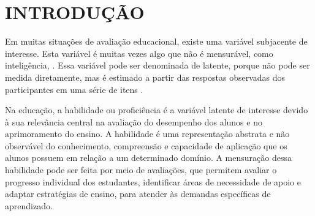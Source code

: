 \chapter{INTRODUÇÃO}

Em muitas situações de avaliação educacional, existe uma variável subjacente de interesse. Esta variável é muitas vezes algo que não é mensurável, como inteligência, \cite{baker2001}. Essa variável pode ser denominada de latente, porque não pode ser medida diretamente, mas é estimado a partir das respostas observadas dos participantes em uma série de itens \cite{pasquali2003}. 


Na educação, a habilidade ou proficiência é a variável latente de interesse devido à sua relevância central na avaliação do desempenho dos alunos e no aprimoramento do ensino. A habilidade é uma representação abstrata e não observável do conhecimento, compreensão e capacidade de aplicação que os alunos possuem em relação a um determinado domínio. A mensuração dessa habilidade pode ser feita por meio de avaliações, que permitem avaliar o progresso individual dos estudantes, identificar áreas de necessidade de apoio e adaptar estratégias de ensino, para atender às demandas específicas de aprendizado.
\begin{comment}
	A avaliação desempenha um papel de extrema importância no contexto educacional, conforme enfatizado por Gimeno (1994) ao afirmar que ``a função fundamental que a avaliação deve cumprir no processo didático é a de informar ou conscientizar os professores acerca de como caminham os acontecimentos em sua turma, os processos de aprendizagem que desencadeiam em cada um de seus alunos, durante o mesmo.'' Essa citação destaca que a avaliação vai além de simplesmente medir resultados; ela serve como um meio essencial para os educadores compreenderem o desenvolvimento de suas turmas. Através da avaliação, os professores podem identificar as necessidades específicas de cada estudante, adaptar suas abordagens pedagógicas e fornecer suporte personalizado, criando um ambiente educacional que promove o crescimento tanto individual quanto coletivo.



A estimativa da habilidade em simulados do oferece aos estudantes uma compreensão precisa do seu nível de preparação e das áreas que requerem melhoria. Isso permite que os alunos identifiquem seus pontos fortes e fracos, direcionando seus esforços de estudo de forma mais eficaz. Além disso, a estimativa da habilidade ajuda os educadores e instituições a adaptar estratégias de ensino e programas de apoio com base nas necessidades reais dos estudantes, contribuindo para um ensino mais eficaz. Para a gestão educacional, a habilidade estimada em simulados pode fornecer informações valiosas sobre o desempenho dos alunos em nível nacional e regional, orientando políticas educacionais informadas e promovendo a melhoria contínua do sistema educacional. 

\end{comment}


